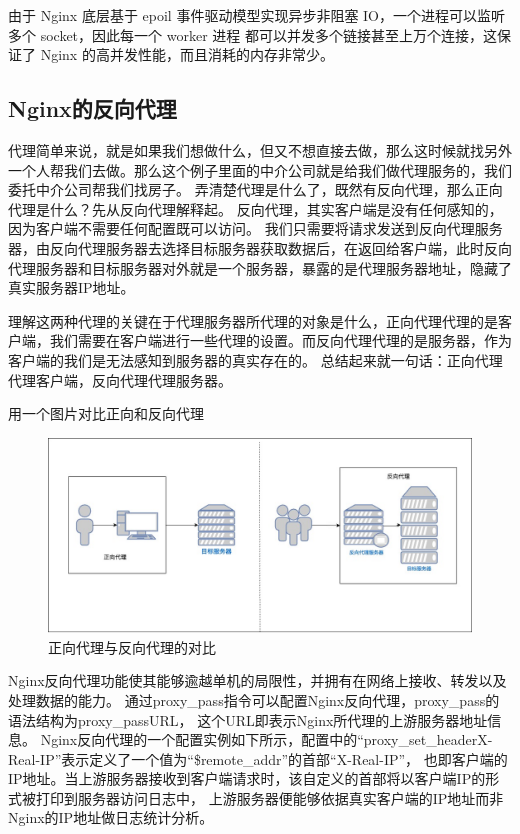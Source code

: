 由于 Nginx 底层基于 epoil 事件驱动模型实现异步非阻塞 IO，一个进程可以监听多个 socket，因此每一个 worker 进程
都可以并发多个链接甚至上万个连接\cite{张炜森2018nginx}，这保证了 Nginx 的高并发性能，而且消耗的内存非常少。

\subsection{Nginx的反向代理}

代理简单来说，就是如果我们想做什么，但又不想直接去做，那么这时候就找另外一个人帮我们去做。那么这个例子里面的中介公司就是给我们做代理服务的，我们委托中介公司帮我们找房子。
弄清楚代理是什么了，既然有反向代理，那么正向代理是什么？先从反向代理解释起。
反向代理，其实客户端是没有任何感知的，因为客户端不需要任何配置既可以访问。
我们只需要将请求发送到反向代理服务器，由反向代理服务器去选择目标服务器获取数据后，在返回给客户端，此时反向代理服务器和目标服务器对外就是一个服务器，暴露的是代理服务器地址，隐藏了真实服务器IP地址。

理解这两种代理的关键在于代理服务器所代理的对象是什么，正向代理代理的是客户端，我们需要在客户端进行一些代理的设置。而反向代理代理的是服务器，作为客户端的我们是无法感知到服务器的真实存在的。
总结起来就一句话：正向代理代理客户端，反向代理代理服务器\cite{崔娟2023基于Nginx反向代理解决公网上服务跨域问题的研究}。

用一个图片对比正向和反向代理

\begin{figure}[htb]
  \centering
  \includegraphics[width=\textwidth]{figures/Forward-Proxy-Reverse-Proxy.jpg}
  \caption{正向代理与反向代理的对比}
\end{figure}

Nginx反向代理功能使其能够逾越单机的局限性，并拥有在网络上接收、转发以及处理数据的能力\cite{马原龙2016nginx}。
通过proxy\_pass指令可以配置Nginx反向代理，proxy\_pass的语法结构为proxy\_passURL，
这个URL即表示Nginx所代理的上游服务器地址信息。
Nginx反向代理的一个配置实例如下所示，配置中的“proxy\_set\_headerX-Real-IP”表示定义了一个值为“\$remote\_addr”的首部“X-Real-IP”，
也即客户端的IP地址。当上游服务器接收到客户端请求时，该自定义的首部将以客户端IP的形式被打印到服务器访问日志中，
上游服务器便能够依据真实客户端的IP地址而非Nginx的IP地址做日志统计分析\cite{吴陈2020基于Nginx的服务器集群负载均衡策略的研究与改进}。

